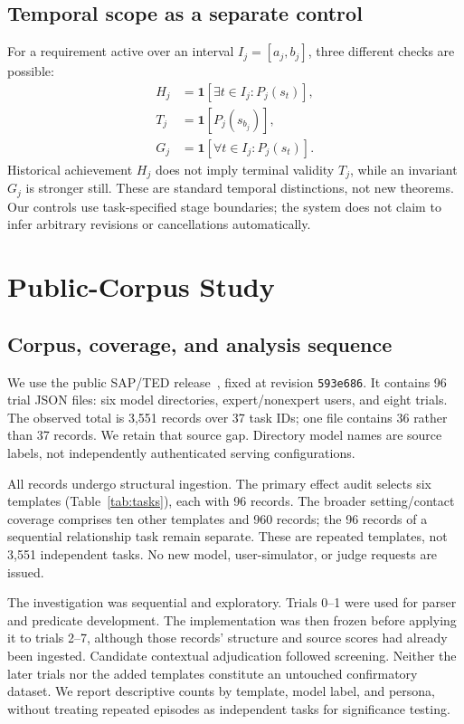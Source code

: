 \documentclass[10pt,letterpaper]{article}
\begin{document}
\subsection{Temporal scope as a separate control}
For a requirement active over an interval $I_j=[a_j,b_j]$, three different checks are possible:
\begin{align}
H_j &= \mathbf{1}[\exists t\in I_j:P_j(s_t)],\\
T_j &= \mathbf{1}[P_j(s_{b_j})],\\
G_j &= \mathbf{1}[\forall t\in I_j:P_j(s_t)].
\label{eq:scope}
\end{align}
Historical achievement $H_j$ does not imply terminal validity $T_j$, while an invariant $G_j$ is stronger still. These are standard temporal distinctions, not new theorems. Our controls use task-specified stage boundaries; the system does not claim to infer arbitrary revisions or cancellations automatically.

\section{Public-Corpus Study}
\label{sec:data}
\subsection{Corpus, coverage, and analysis sequence}
We use the public SAP/TED release~\cite{sapdata}, fixed at revision \texttt{593e686}. It contains 96 trial JSON files: six model directories, expert/nonexpert users, and eight trials. The observed total is 3,551 records over 37 task IDs; one file contains 36 rather than 37 records. We retain that source gap. Directory model names are source labels, not independently authenticated serving configurations.

All records undergo structural ingestion. The primary effect audit selects six templates (Table~\ref{tab:tasks}), each with 96 records. The broader setting/contact coverage comprises ten other templates and 960 records; the 96 records of a sequential relationship task remain separate. These are repeated templates, not 3,551 independent tasks. No new model, user-simulator, or judge requests are issued.

The investigation was sequential and exploratory. Trials 0--1 were used for parser and predicate development. The implementation was then frozen before applying it to trials 2--7, although those records' structure and source scores had already been ingested. Candidate contextual adjudication followed screening. Neither the later trials nor the added templates constitute an untouched confirmatory dataset. We report descriptive counts by template, model label, and persona, without treating repeated episodes as independent tasks for significance testing.
\end{document}
